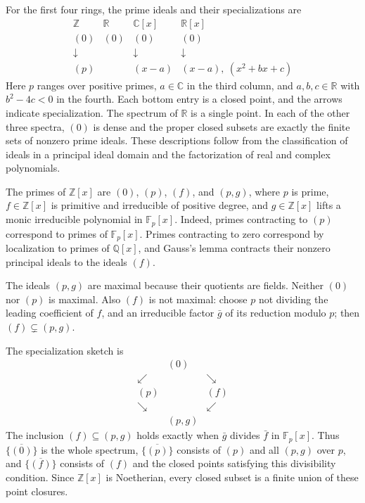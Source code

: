 For the first four rings, the prime ideals and their specializations are
\[\begin{array}{c|c|c|c}\mathbb Z&\mathbb R&\mathbb C[x]&\mathbb R[x]\\(0)&(0)&(0)&(0)\\\downarrow&&\downarrow&\downarrow\\(p)&&(x-a)&(x-a),\ (x^2+bx+c)\end{array}\]
Here $p$ ranges over positive primes, $a\in\mathbb C$ in the third column, and $a,b,c\in\mathbb R$ with $b^2-4c<0$ in the fourth. Each bottom entry is a closed point, and the arrows indicate specialization. The spectrum of $\mathbb R$ is a single point. In each of the other three spectra, $(0)$ is dense and the proper closed subsets are exactly the finite sets of nonzero prime ideals. These descriptions follow from the classification of ideals in a principal ideal domain and the factorization of real and complex polynomials.

The primes of $\mathbb Z[x]$ are $(0)$, $(p)$, $(f)$, and $(p,g)$, where $p$ is prime, $f\in\mathbb Z[x]$ is primitive and irreducible of positive degree, and $g\in\mathbb Z[x]$ lifts a monic irreducible polynomial in $\mathbb F_p[x]$. Indeed, primes contracting to $(p)$ correspond to primes of $\mathbb F_p[x]$. Primes contracting to zero correspond by localization to primes of $\mathbb Q[x]$, and Gauss's lemma contracts their nonzero principal ideals to the ideals $(f)$.

The ideals $(p,g)$ are maximal because their quotients are fields. Neither $(0)$ nor $(p)$ is maximal. Also $(f)$ is not maximal: choose $p$ not dividing the leading coefficient of $f$, and an irreducible factor $\bar g$ of its reduction modulo $p$; then $(f)\subsetneq(p,g)$.

The specialization sketch is
\[\begin{array}{ccc}&(0)&\\\swarrow&&\searrow\\(p)&&(f)\\\searrow&&\swarrow\\&(p,g)&\end{array}\]
The inclusion $(f)\subseteq(p,g)$ holds exactly when $\bar g$ divides $\bar f$ in $\mathbb F_p[x]$. Thus $\overline{\{(0)\}}$ is the whole spectrum, $\overline{\{(p)\}}$ consists of $(p)$ and all $(p,g)$ over $p$, and $\overline{\{(f)\}}$ consists of $(f)$ and the closed points satisfying this divisibility condition. Since $\mathbb Z[x]$ is Noetherian, every closed subset is a finite union of these point closures.
